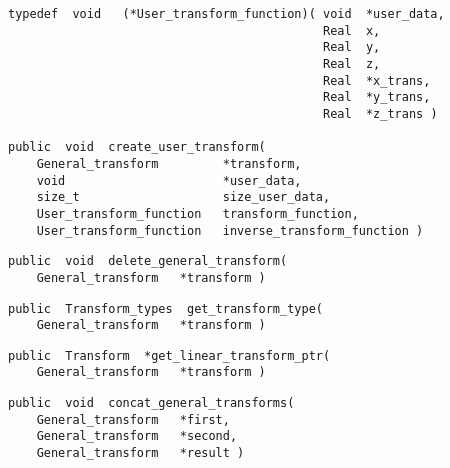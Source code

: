 {\bf\begin{verbatim}
typedef  void   (*User_transform_function)( void  *user_data,
                                            Real  x,
                                            Real  y,
                                            Real  z,
                                            Real  *x_trans,
                                            Real  *y_trans,
                                            Real  *z_trans )

public  void  create_user_transform(
    General_transform         *transform,
    void                      *user_data,
    size_t                    size_user_data,
    User_transform_function   transform_function,
    User_transform_function   inverse_transform_function )
\end{verbatim}}


{\bf\begin{verbatim}
public  void  delete_general_transform(
    General_transform   *transform )
\end{verbatim}}


{\bf\begin{verbatim}
public  Transform_types  get_transform_type(
    General_transform   *transform )
\end{verbatim}}


{\bf\begin{verbatim}
public  Transform  *get_linear_transform_ptr(
    General_transform   *transform )
\end{verbatim}}


{\bf\begin{verbatim}
public  void  concat_general_transforms(
    General_transform   *first,
    General_transform   *second,
    General_transform   *result )
\end{verbatim}}


